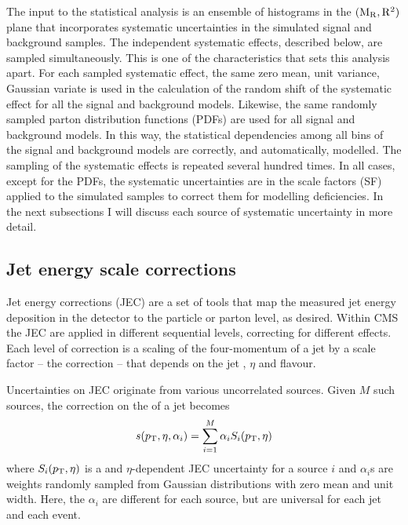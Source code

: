 
 
The input to the statistical analysis is an ensemble of histograms in the $(\mathrm{M_R},\mathrm{R^2})$ plane that 
incorporates systematic uncertainties in the simulated signal and background samples.  
The independent systematic effects, described below, are sampled simultaneously. 
This is one of the characteristics that sets this analysis apart. 
For each sampled systematic effect, the same zero mean, unit variance, Gaussian variate is used in
the calculation of the random shift of the systematic effect for all the signal and background
models. Likewise, the same randomly sampled parton distribution functions (PDFs) are used for all
signal and background models. 
In this way, the statistical dependencies among all bins of the signal and background models are
correctly, and automatically, modelled. The sampling of the systematic effects
is repeated several hundred times.  
In all cases, except for the PDFs, the systematic uncertainties are in the scale factors (SF) 
applied to the simulated samples to correct them for modelling deficiencies. 
In the next subsections I will discuss each source of systematic uncertainty in more detail. 


\subsection{Jet energy scale corrections}  


Jet energy corrections (JEC) are a set of tools that map the measured jet energy deposition in the
detector to the particle or parton level, as desired. 
Within CMS the JEC are applied in different sequential levels, correcting for different effects.
Each level of correction is a scaling of the four-momentum of a jet by a scale factor -- the
correction -- that depends on the jet \pt, $\eta$ and flavour.  

Uncertainties on JEC originate from various uncorrelated sources.   
Given $M$ such sources, the correction on the \pt of a jet becomes 
\begin{equation}
s(p_{\mathrm{T}}, \eta, \alpha_i) = \sum_{i=1}^M \alpha_i S_i (p_{\mathrm{T}}, \eta)
\end{equation}
where $S_i (p_{\mathrm{T}}, \eta)$ is a \pt and $\eta$-dependent JEC uncertainty for a source $i$ and
$\alpha_i$s are weights randomly sampled from Gaussian distributions with zero mean and unit
width. 
Here, the $\alpha_i$ are different for each source, but are universal for each jet and each event.

